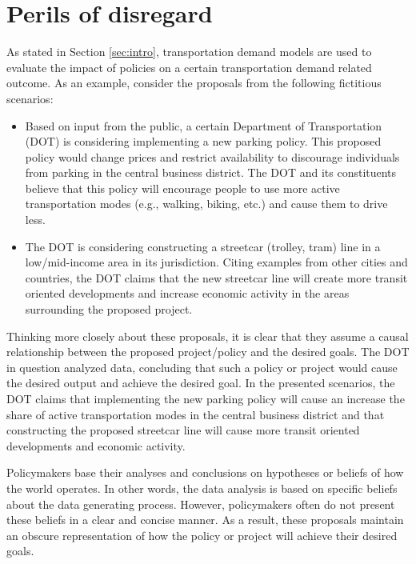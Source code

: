 \section{Perils of disregard}
\label{sec:graph-importance}

As stated in Section \ref{sec:intro}, transportation demand models are used to evaluate the impact of policies on a certain
transportation demand related outcome. As an example, consider the proposals from the following fictitious scenarios:
\begin{itemize}
 \item Based on input from the public, a certain Department of Transportation (DOT) is considering implementing a new parking policy.
 This proposed policy would change prices and restrict availability to discourage individuals from parking in the central business district.
 The DOT and its constituents believe that this policy will encourage people to use more active transportation modes (e.g., walking, biking, etc.) and cause them to drive less.
 \item The DOT is considering constructing a streetcar (trolley, tram) line in a low/mid-income area in its jurisdiction.
 Citing examples from other cities and countries, the DOT claims that the new streetcar line will create more transit oriented developments and increase economic activity in the areas surrounding the proposed project.
 \end{itemize}


Thinking more closely about these proposals, it is clear that they assume a causal relationship between the proposed project/policy and the desired goals.
The DOT in question analyzed data, concluding that such a policy or project would cause the desired output and achieve the desired goal.
In the presented scenarios, the DOT claims that implementing the new parking policy will cause an increase the share of
active transportation modes in the central business district and that constructing the proposed streetcar line will
cause more transit oriented developments and economic activity.

Policymakers base their analyses and conclusions on hypotheses or beliefs of how the world operates.
In other words, the data analysis is based on specific beliefs about the data generating process.
However, policymakers often do not present these beliefs in a clear and concise manner.
As a result, these proposals maintain an obscure representation of how the policy or project will achieve their desired goals.


